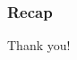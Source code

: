 \documentclass[10pt]{beamer}
\begin{document}
\begin{frame}[c]
  \frametitle{Recap}

\end{frame}

\begin{frame}[standout]
  Thank you!
\end{frame}

%
\end{document}
